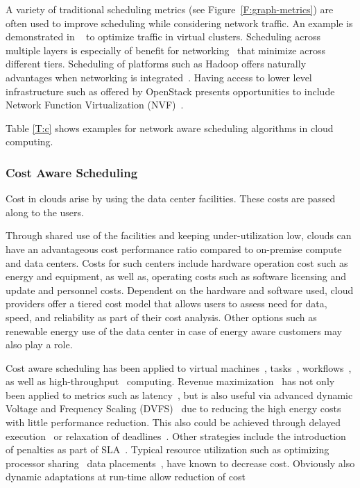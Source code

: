 \documentclass[final,5p,times,twocolumn]{elsarticle}
\newcommand{\TODO}[1]{\todo[inline]{#1}}
\begin{document}
\TODO{THIS FIGURE IS MISSING}

A variety of traditional scheduling metrics (see
Figure~\ref{F:graph-metrics}) are often used to improve scheduling
while considering network traffic. An example is demonstrated in
~\cite{yu2017survivable} to optimize traffic in virtual clusters.
Scheduling across multiple layers is especially of benefit for
networking~\cite{bi2015sla} that minimize across different tiers.
Scheduling of platforms such as Hadoop offers naturally advantages
when networking is integrated~\cite{kondikoppa2012network}.  Having
access to lower level infrastructure such as offered by OpenStack
presents opportunities to include Network Function Virtualization
(NVF)~\cite{lucrezia2015introducing}.

Table \ref{T:c} shows examples for network aware scheduling algorithms
in cloud computing.






\subsubsection{Cost Aware Scheduling}\label{sec:cost}


Cost in clouds arise by using the data center facilities. These costs
are passed along to the users.

Through shared use of the facilities and keeping under-utilization
low, clouds can have an advantageous cost performance ratio compared
to on-premise compute and data centers. Costs for such centers include
hardware operation cost such as energy and equipment, as well as,
operating costs such as software licensing and update and personnel
costs. Dependent on the hardware and software used, cloud providers
offer a tiered cost model that allows users to assess need for data,
speed, and reliability as part of their cost analysis.  Other options
such as renewable energy use of the data center in case of energy
aware customers may also play a role.

Cost aware scheduling has been applied to virtual
machines~\cite{yuan2017ttsa},
tasks~\cite{yuan2017temporal,zuo2015multi},
workflows~\cite{arabnejad2015cost,arabnejad2016budget}, as well as
high-throughput~\cite{yuan2016cawsac} computing.  Revenue
maximization~\cite{yuan2018warm} has not only been applied to metrics
such as latency~\cite{ghahramani2017toward}, but is also useful via
advanced dynamic Voltage and Frequency Scaling
(DVFS)~\cite{las10cloudsched,calheiros2014energy} due to reducing the
high energy costs with little performance reduction. This also could
be achieved through delayed execution~\cite{bi2016trs} or relaxation
of deadlines~\cite{zhang2018dynamic}.  Other strategies include the
introduction of penalties as part of SLA~\cite{wu2012sla}. Typical
resource utilization such as optimizing processor
sharing~\cite{lee2012profit} data placements~\cite{lee2012profit},
have known to decrease cost. Obviously also dynamic
adaptations at run-time allow reduction of cost~\cite{ari2013design}
\end{document}
